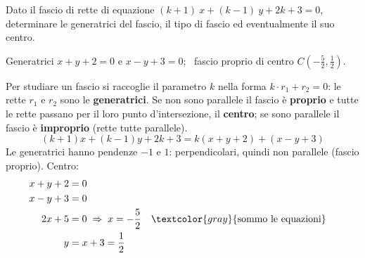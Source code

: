 \begin{question}[ID=1.2, subtitle={Fascio $(k+1)x+(k-1)y+2k+3=0$: tipo e centro}, tags={fascio di rette}, difficulty=facile]
Dato il fascio di rette di equazione $(k+1) \ x + (k-1) \ y + 2k + 3 = 0$, determinare le generatrici del fascio, il tipo di fascio ed eventualmente il suo centro.
\begin{solution}
Generatrici $x+y+2=0$ e $x-y+3=0$; \ fascio proprio di centro $C\left(-\tfrac52,\tfrac12\right)$.
\end{solution}
\begin{explanation}
Per studiare un fascio si raccoglie il parametro $k$ nella forma $k\cdot r_1+r_2=0$: le rette $r_1$ e $r_2$ sono le \textbf{generatrici}. Se non sono parallele il fascio è \textbf{proprio} e tutte le rette passano per il loro punto d'intersezione, il \textbf{centro}; se sono parallele il fascio è \textbf{improprio} (rette tutte parallele).
\[ (k+1)x+(k-1)y+2k+3=k(x+y+2)+(x-y+3) \]
Le generatrici hanno pendenze $-1$ e $1$: perpendicolari, quindi non parallele (fascio proprio). Centro:
\[\begin{aligned}
x+y+2 &= 0\\
x-y+3 &= 0\\
2x+5 &= 0 \;\Rightarrow\; x=-\dfrac52 && \textcolor{gray}{\text{sommo le equazioni}}\\
y &= x+3=\dfrac12
\end{aligned}\]
\end{explanation}
\end{question}

